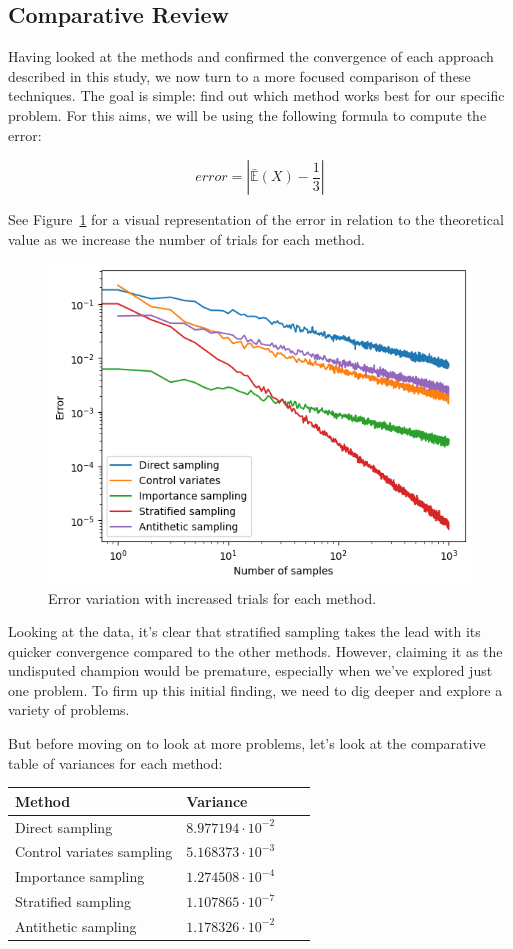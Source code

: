 \documentclass{report}
\begin{document}
\subsection{Comparative Review}
\label{sec:comparative_review}

Having looked at the methods and confirmed the convergence of each approach described in this study, we now turn to a more focused comparison of these techniques. The goal is simple: find out which method works best for our specific problem. For this aims, we will be using the following formula to compute the error:

\begin{equation*} error = | \bar{\mathbb{E}}(X) - \frac{1}{3} | \end{equation*}

See Figure~\ref{fig:comparisonvariancereduction} for a visual representation of the error in relation to the theoretical value as we increase the number of trials for each method.

\begin{figure}[H]
\centering
\includegraphics[width=0.5\linewidth]{./Figures/VarianceReduction/comparison.png}
\caption{Error variation with increased trials for each method.}
\label{fig:comparisonvariancereduction}
\end{figure}

Looking at the data, it’s clear that stratified sampling takes the lead with its quicker convergence compared to the other methods. However, claiming it as the undisputed champion would be premature, especially when we’ve explored just one problem. To firm up this initial finding, we need to dig deeper and explore a variety of problems.

But before moving on to look at more problems, let's look at the comparative table of variances for each method:

\begin{center}
	\begin{tabular}{ |p{5cm}||p{3cm}|p{3cm}|p{3cm}|  }
		\hline
		Method & Variance \\
		\hline
		\hline
		Direct sampling   			& \(8.977194 \cdot 10^{-2}\) \\
		\hline
		Control variates sampling 	& \(5.168373 \cdot 10^{-3}\) \\
		\hline
		Importance sampling      	& \(1.274508 \cdot 10^{-4}\) \\
		\hline
		Stratified sampling       	& \(1.107865 \cdot 10^{-7}\) \\
		\hline
		Antithetic sampling      	& \(1.178326 \cdot 10^{-2}\) \\
		\hline
	\end{tabular}
\end{center}
\end{document}
